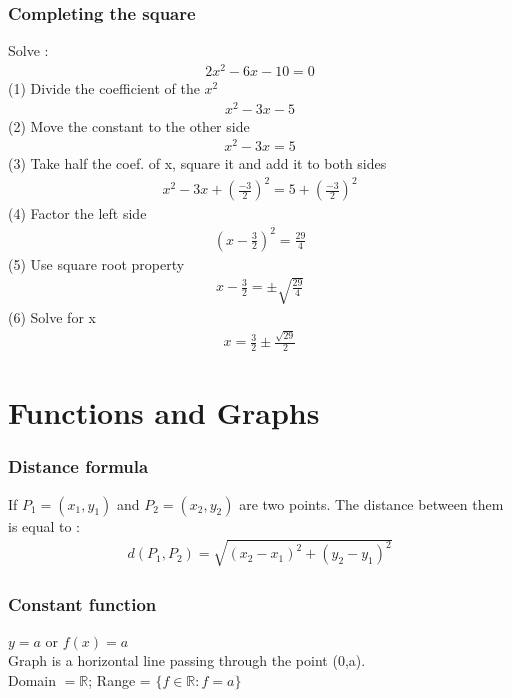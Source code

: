 \documentclass[10pt,onecolumn]{article}
\begin{document}
{\section{Completing the square}
Solve : \\
\begin{align*}
2x^2 - 6x - 10 = 0
\end{align*}
(1) Divide the coefficient of the $x^2$ \\
\begin{align*}
x^2 -3x - 5
\end{align*}
(2) Move the constant to the other side \\
\begin{align*}
x^2 - 3x = 5 
\end{align*}
(3) Take half the coef. of x, square it and add it to both sides \\
\begin{align*}
x^2 - 3x + (\frac{-3}{2})^2 = 5 + (\frac{-3}{2})^2
\end{align*}
(4) Factor the left side \\
\begin{align*}
(x - \frac{3}{2})^2 = \frac{29}{4}
\end{align*}
(5) Use square root property \\
\begin{align*}
x - \frac{3}{2} = \pm \sqrt{\frac{29}{4}}
\end{align*}
(6) Solve for x \\
\begin{align*}
x = \frac{3}{2} \pm \frac{\sqrt{29}}{2}
\end{align*}
\pagebreak

\part{Functions and Graphs}

\section{Distance formula}
If $P_1 = (x_1, y_1) $ and $P_2 = (x_2, y_2)$ are two points. The distance between them is equal to : \\
\begin{align*}
d(P_1, P_2) = \sqrt{(x_2 - x_1)^2 + (y_2 - y_1)^2}
\end{align*}

\section{Constant function}
$y = a$ or $f(x) = a $ \\ 
Graph is a horizontal line passing through the point (0,a). \\
Domain $= \mathbb{R}$; Range = $\{f \in \mathbb{R} \colon f = a\} $ 

}
\end{document}

